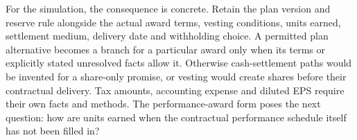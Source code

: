 For the simulation, the consequence is concrete. Retain the plan version and
reserve rule alongside the actual award terms, vesting conditions, units
earned, settlement medium, delivery date and withholding choice. A permitted
plan alternative becomes a branch for a particular award only when its terms
or explicitly stated unresolved facts allow it. Otherwise cash-settlement
paths would be invented for a share-only promise, or vesting would create
shares before their contractual delivery. Tax amounts, accounting expense
and diluted EPS require their own facts and methods. The performance-award
form poses the next question: how are units earned when the contractual
performance schedule itself has not been filled in?
